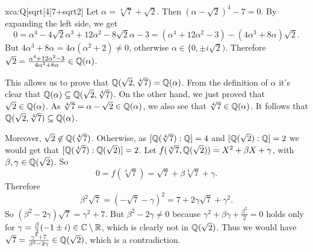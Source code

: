\begin{sol}{xca:Q[sqrt[4]{7}+sqrt{2}]}
Let $\alpha=\sqrt[4]{7}+\sqrt{2}$. Then $(\alpha - \sqrt{2})^4 -7 = 0$.
By expanding the left side, we get
\[
0  =\alpha^4 - 4\sqrt{2}\alpha^3 + 12 \alpha^2 - 8\sqrt{2}\alpha - 3 
 = (\alpha^4 + 12\alpha^2 - 3) -  (4 \alpha^3 + 8 \alpha )\sqrt{2}.
\]
But $4 \alpha^3 + 8 \alpha = 4\alpha (\alpha^2+2) \neq 0$, otherwise $\alpha\in\{0,\pm i\sqrt{2})$.
Therefore $\sqrt{2}=\frac{\alpha^4 + 12\alpha^2 - 3}{4 \alpha^3 + 8 \alpha}\in \mathbb{Q}(\alpha) $.

This allows us to prove that $\mathbb{Q}(\sqrt{2} , \sqrt[4]{7}) = \mathbb{Q}(\alpha)$.
From the definition of $\alpha$ it's clear that 
$\mathbb{Q}(\alpha) \subseteq \mathbb{Q}(\sqrt{2} , \sqrt[4]{7})$.
On the other hand, we just proved that $\sqrt{2} \in \mathbb{Q}(\alpha)$.
As $\sqrt[4]{7} = \alpha - \sqrt{2} \in \mathbb{Q}(\alpha)$,
we also see that $\sqrt[4]{7} \in \mathbb{Q}(\alpha)$.
It follows that $\mathbb{Q}(\sqrt{2} , \sqrt[4]{7}) \subseteq \mathbb{Q}(\alpha)$.

Moreover, $\sqrt{2}\not\in \mathbb{Q}(\sqrt[4]{7})$. 
Otherwise, as $[\mathbb{Q}(\sqrt[4]{7}):\mathbb{Q}] = 4$ and $[\mathbb{Q}(\sqrt{2}):\mathbb{Q}] = 2$
we would get that $[\mathbb{Q}(\sqrt[4]{7}):\mathbb{Q}(\sqrt{2})] = 2$.
Let $f(\sqrt[4]{7},\mathbb{Q}(\sqrt{2})) = X^2 + \beta X + \gamma$,
with $\beta, \gamma \in \mathbb{Q}(\sqrt{2})$. 
So 
$$0=f(\sqrt[4]{7})=\sqrt{7} + \beta \sqrt[4]{7} + \gamma.$$
Therefore 
$$\beta^2 \sqrt{7}  = (- \sqrt{7} - \gamma)^2 =7 + 2\gamma \sqrt{7}  + \gamma^2.$$
So $(\beta^2 - 2 \gamma)\sqrt{7}= \gamma^2 + 7$.
But $\beta^2 - 2 \gamma\neq 0$ because 
$\gamma^2 + \beta \gamma + \frac{\beta^2}{2} = 0$ 
holds only for $\gamma =\frac{\beta}{2} (-1 \pm i)\in \mathbb{C}\setminus\mathbb{R}$,
which is clearly not in $\mathbb{Q}(\sqrt{2})$.
Thus we would have 
$\sqrt{7} = \frac{\gamma^2 + 7}{\beta^2 - 2 \gamma} \in \mathbb{Q}(\sqrt{2})$, which 
is a contradiction.


\end{sol}
